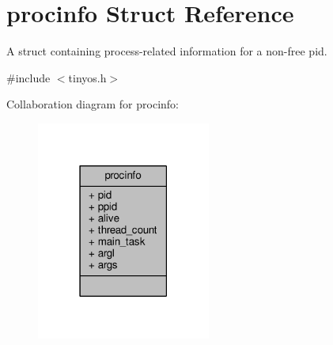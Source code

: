 \hypertarget{structprocinfo}{\section{procinfo Struct Reference}
\label{structprocinfo}
}


A struct containing process-\/related information for a non-\/free pid.  




{\ttfamily \#include $<$tinyos.\-h$>$}



Collaboration diagram for procinfo\-:
\nopagebreak
\begin{figure}[H]
\begin{center}
\leavevmode
\includegraphics[width=162pt]{structprocinfo__coll__graph}
\end{center}
\end{figure}

